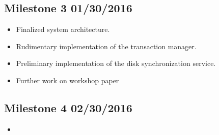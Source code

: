 \documentclass[letterpaper]{article}
\begin{document}
  \subsection{Milestone 3 01/30/2016}
  \begin{itemize}
   \item Finalized system architecture.
   \item Rudimentary implementation of the transaction manager.
   \item Preliminary implementation of the disk synchronization service.
   \item Further work on workshop paper
  \end{itemize}
  \subsection{Milestone 4 02/30/2016}
  \begin{itemize}
   \item 
  \end{itemize}
\end{document}
